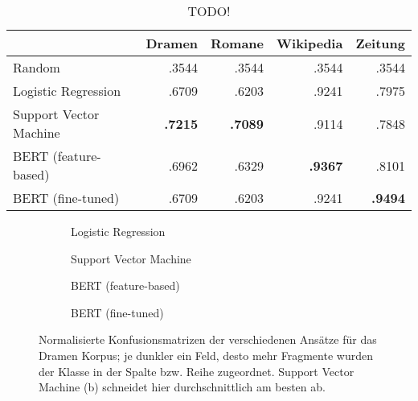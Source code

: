 \begin{table}
\centering
\begin{tabular}{lrrrr}
\toprule
{} & Dramen  &    Romane &  Wikipedia &  Zeitung\\
\midrule

Random&  .3544&.3544&.3544&.3544 \\
Logistic Regression&.6709&.6203&.9241&.7975 \\
Support Vector Machine&\textbf{.7215}&\textbf{.7089}&.9114&.7848 \\
BERT (feature-based)&.6962&.6329&\textbf{.9367}&.8101 \\
BERT (fine-tuned)&.6709&.6203&.9241&\textbf{.9494} \\

\bottomrule
\end{tabular}
\caption{TODO!}
\end{table}





\begin{figure}
\centering
\begin{subfigure}[b]{.45\linewidth}

\caption{Logistic Regression}\label{fig:drama-log}
\end{subfigure}
\begin{subfigure}[b]{.45\linewidth}

\caption{Support Vector Machine}\label{fig:drama-svm}
\end{subfigure}

\begin{subfigure}[b]{.45\linewidth}

\caption{BERT (feature-based)}\label{fig:drama-feat}
\end{subfigure}
\begin{subfigure}[b]{.45\linewidth}

\caption{BERT (fine-tuned)}\label{fig:drama-fine}
\end{subfigure}
\caption{Normalisierte Konfusionsmatrizen der verschiedenen Ansätze für das Dramen Korpus; je dunkler ein Feld, desto mehr Fragmente wurden der Klasse in der Spalte bzw. Reihe zugeordnet. Support Vector Machine (b) schneidet hier durchschnittlich am besten ab.}
\label{fig:drama}
\end{figure}




